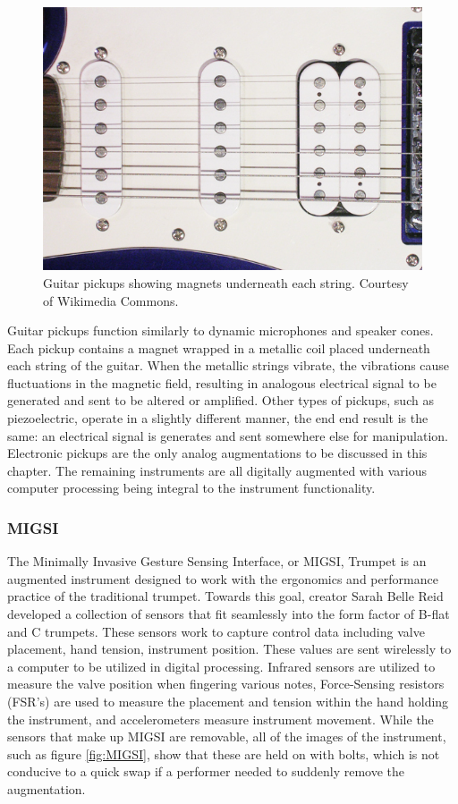 \begin{figure}
    \centering
    \includegraphics[scale=0.5, angle=180]{diagrams/Pickup-SSH.jpg}
    \caption{Guitar pickups showing magnets underneath each string. Courtesy of Wikimedia Commons.} %
    \label{fig:pickups}
\end{figure}

Guitar pickups function similarly to dynamic microphones and speaker cones. Each pickup contains a magnet wrapped in a metallic coil placed underneath each string of the guitar. When the metallic strings vibrate, the vibrations cause fluctuations in the magnetic field, resulting in analogous electrical signal to be generated and sent to be altered or amplified\cite{coils09}. Other types of pickups, such as piezoelectric, operate in a slightly different manner, the end end result is the same: an electrical signal is generates and sent somewhere else for manipulation. Electronic pickups are the only analog augmentations to be discussed in this chapter. The remaining instruments are all digitally augmented with various computer processing being integral to the instrument functionality.

\subsubsection{MIGSI}

The Minimally Invasive Gesture Sensing Interface, or MIGSI, Trumpet is an augmented instrument designed to work with the ergonomics and performance practice of the traditional trumpet\cite{reid2016}. Towards this goal, creator Sarah Belle Reid developed a collection of sensors that fit seamlessly into the form factor of B-flat and C trumpets. These sensors work to capture control data including valve placement, hand tension, instrument position. These values are sent wirelessly to a computer to be utilized in digital processing. Infrared sensors are utilized to measure the valve position when fingering various notes, Force-Sensing resistors (FSR's) are used to measure the placement and tension within the hand holding the instrument, and accelerometers measure instrument movement. While the sensors that make up MIGSI are removable, all of the images of the instrument, such as figure \ref{fig:MIGSI}, show that these are held on with bolts, which is not conducive to a quick swap if a performer needed to suddenly remove the augmentation.

